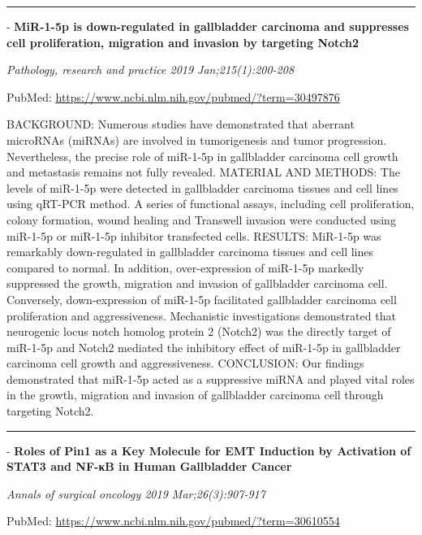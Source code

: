 \documentclass[]{article}
\begin{document}
\begin{center}\rule{0.5\linewidth}{\linethickness}\end{center}

 - \textbf{MiR-1-5p is down-regulated in gallbladder carcinoma and
suppresses cell proliferation, migration and invasion by targeting
Notch2}

\emph{Pathology, research and practice 2019 Jan;215(1):200-208}

PubMed: \url{https://www.ncbi.nlm.nih.gov/pubmed/?term=30497876}

BACKGROUND: Numerous studies have demonstrated that aberrant microRNAs
(miRNAs) are involved in tumorigenesis and tumor progression.
Nevertheless, the precise role of miR-1-5p in gallbladder carcinoma cell
growth and metastasis remains not fully revealed. MATERIAL AND METHODS:
The levels of miR-1-5p were detected in gallbladder carcinoma tissues
and cell lines using qRT-PCR method. A series of functional assays,
including cell proliferation, colony formation, wound healing and
Transwell invasion were conducted using miR-1-5p or miR-1-5p inhibitor
transfected cells. RESULTS: MiR-1-5p was remarkably down-regulated in
gallbladder carcinoma tissues and cell lines compared to normal. In
addition, over-expression of miR-1-5p markedly suppressed the growth,
migration and invasion of gallbladder carcinoma cell. Conversely,
down-expression of miR-1-5p facilitated gallbladder carcinoma cell
proliferation and aggressiveness. Mechanistic investigations
demonstrated that neurogenic locus notch homolog protein 2 (Notch2) was
the directly target of miR-1-5p and Notch2 mediated the inhibitory
effect of miR-1-5p in gallbladder carcinoma cell growth and
aggressiveness. CONCLUSION: Our findings demonstrated that miR-1-5p
acted as a suppressive miRNA and played vital roles in the growth,
migration and invasion of gallbladder carcinoma cell through targeting
Notch2.

{}

{}

\begin{center}\rule{0.5\linewidth}{\linethickness}\end{center}

 - \textbf{Roles of Pin1 as a Key Molecule for EMT Induction by
Activation of STAT3 and NF-κB in Human Gallbladder Cancer}

\emph{Annals of surgical oncology 2019 Mar;26(3):907-917}

PubMed: \url{https://www.ncbi.nlm.nih.gov/pubmed/?term=30610554}
\end{document}
